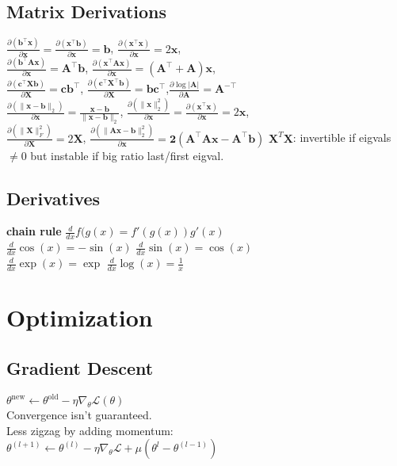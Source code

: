 \subsection*{Matrix Derivations}
$\frac{\partial(\mathbf{b}^\top \mathbf{x})}{\partial \mathbf{x}}{=}\frac{\partial (\mathbf{x}^\top \mathbf{b})}{\partial \mathbf{x}}{=} \mathbf{b}$, 
$\frac{\partial (\mathbf{x}^\top \mathbf{x})}{\partial \mathbf{x}}{=} 2\mathbf{x}$, \\
$\frac{\partial (\mathbf{b}^\top \mathbf{A}\mathbf{x}) } {\partial \mathbf{x}}{=}\mathbf{A}^\top \mathbf{b}$,
$\frac{\partial (\mathbf{x}^\top \mathbf{A}\mathbf{x})} {\partial \mathbf{x}} {=} (\mathbf{A}^\top{+}\mathbf{A})\mathbf{x}$,\\
$\frac{\partial(\mathbf{c}^\top \mathbf{X} \mathbf{b})} {\partial \mathbf{X}}{=}\mathbf{c}\mathbf{b}^\top$, 
$\frac{\partial (\mathbf{c}^\top \mathbf{X}^\top \mathbf{b})}{\partial \mathbf{X}}{=}\mathbf{b}\mathbf{c}^\top$,$\frac{\partial\log|\mathbf{A}|}{\partial \mathbf{A}}{=}\mathbf{A}^{-\top}$\\
$\frac{\partial(\| \mathbf{x}-\mathbf{b} \|_2)}{\partial \mathbf{x}}{=}\frac{\mathbf{x}-\mathbf{b}}{\|\mathbf{x}-\mathbf{b}\|_2}$, 
$\frac{\partial(\|\mathbf{x}\|^2_2)}{\partial \mathbf{x}}{=}\frac{\partial (\mathbf{x}^\top \mathbf{x})}{\partial \mathbf{x}} {=}2\mathbf{x}$,\\
$\frac{\partial (\|\mathbf{X}\|_F^2) }{\partial \mathbf{X}}{=} 2\mathbf{X}$,
$\frac{\partial(\|\mathbf{Ax - b}\|_2^2)}{\partial \mathbf{x}}{=} \mathbf{2(A^\top Ax-A^\top b)}$
$\mathbf{X}^T\mathbf{X}$: invertible if eigvals ${\neq}0$ but instable if big ratio last/first eigval.
\subsection*{Derivatives}
\textbf{chain rule} $\frac{d}{dx}f(g(x){=}f'(g(x))g'(x)$\\
$\frac{d}{dx}\cos(x){=-}\sin(x)$ $\frac{d}{dx}\sin(x){=}\cos(x)$\\
$\frac{d}{dx}\exp(x){=}\exp$ $\frac{d}{dx}\log(x){=}\frac{1}{x}$

\section*{Optimization}
\subsection*{Gradient Descent}
$\theta^{\mathrm{new}}\leftarrow\theta^{\mathrm{old}}-\eta\nabla_{\theta}\mathcal{L}(\theta)$\\
Convergence isn't guaranteed.\\
Less zigzag by adding momentum: \\$\theta^{(l+1)}\leftarrow\theta^{(l)}-\eta\nabla_{\theta}\mathcal{L}+\mu(\theta^{l}-\theta^{(l-1)})$

